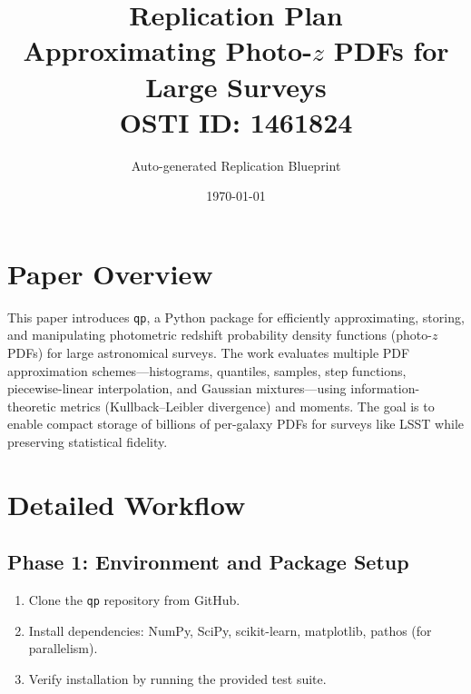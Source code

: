 \documentclass[11pt,a4paper]{article}
\title{\textbf{Replication Plan}\\[0.5em]
\large Approximating Photo-$z$ PDFs for Large Surveys\\[0.3em]
\normalsize OSTI ID: 1461824}
\author{Auto-generated Replication Blueprint}
\date{\today}
\begin{document}
\maketitle
\tableofcontents
\newpage

\section{Paper Overview}
This paper introduces \texttt{qp}, a Python package for efficiently approximating, storing, and manipulating photometric redshift probability density functions (photo-$z$ PDFs) for large astronomical surveys. The work evaluates multiple PDF approximation schemes---histograms, quantiles, samples, step functions, piecewise-linear interpolation, and Gaussian mixtures---using information-theoretic metrics (Kullback--Leibler divergence) and moments. The goal is to enable compact storage of billions of per-galaxy PDFs for surveys like LSST while preserving statistical fidelity.

\section{Detailed Workflow}

\subsection{Phase 1: Environment and Package Setup}
\begin{enumerate}[label=\textbf{1.\arabic*}]
  \item Clone the \texttt{qp} repository from GitHub.
  \item Install dependencies: NumPy, SciPy, scikit-learn, matplotlib, pathos (for parallelism).
  \item Verify installation by running the provided test suite.
\end{enumerate}
\end{document}
